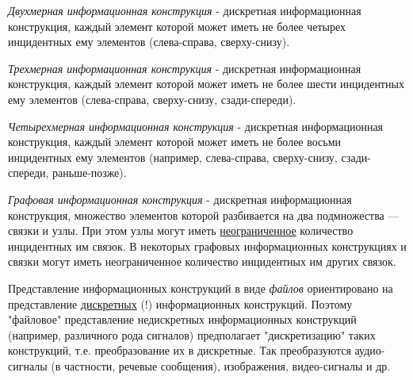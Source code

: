 \textit{Двухмерная информационная конструкция} - дискретная информационная конструкция, каждый элемент которой может иметь не более четырех инцидентных ему элементов (слева-справа, сверху-снизу).

\textit{Трехмерная информационная конструкция} - дискретная информационная конструкция, каждый элемент которой может иметь не более шести инцидентных ему элементов (слева-справа, сверху-снизу, сзади-спереди).

\textit{Четырехмерная информационная конструкция} - дискретная информационная конструкция, каждый элемент которой может иметь не более восьми инцидентных ему элементов (например, слева-справа, сверху-снизу, сзади-спереди, раньше-позже).

\textit{Графовая информационная конструкция} - дискретная информационная конструкция, множество элементов которой разбивается на два подмножества — связки и узлы. При этом узлы могут иметь \underline{неограниченное} количество инцидентных им связок. В некоторых графовых информационных конструкциях и связки могут иметь неограниченное количество инцидентных им других связок.

\begin{SCn}

    \begin{scnindent}
        \begin{scnindent}
        \end{scnindent}
    \end{scnindent}

\end{SCn}

Представление информационных конструкций в виде \textit{файлов} ориентировано на представление \underline{дискретных} (!) информационных конструкций. Поэтому "файловое"{} представление недискретных информационных конструкций (например, различного рода сигналов) предполагает "дискретизацию"{} таких конструкций, т.е. преобразование их в дискретные. Так преобразуются аудио-сигналы (в частности, речевые сообщения), изображения, видео-сигналы и др.

